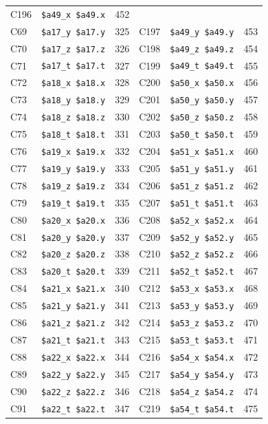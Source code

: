 \begin{table}
\begin{center}
{\begin{tabular}{|l|l|l||l|l|l|}
C196 & \verb|$a49_x $a49.x| & 452 \\
C69 & \verb|$a17_y $a17.y| & 325 &
C197 & \verb|$a49_y $a49.y| & 453 \\
C70 & \verb|$a17_z $a17.z| & 326 &
C198 & \verb|$a49_z $a49.z| & 454 \\
C71 & \verb|$a17_t $a17.t| & 327 &
C199 & \verb|$a49_t $a49.t| & 455 \\
C72 & \verb|$a18_x $a18.x| & 328 &
C200 & \verb|$a50_x $a50.x| & 456 \\
C73 & \verb|$a18_y $a18.y| & 329 &
C201 & \verb|$a50_y $a50.y| & 457 \\
C74 & \verb|$a18_z $a18.z| & 330 &
C202 & \verb|$a50_z $a50.z| & 458 \\
C75 & \verb|$a18_t $a18.t| & 331 &
C203 & \verb|$a50_t $a50.t| & 459 \\
C76 & \verb|$a19_x $a19.x| & 332 &
C204 & \verb|$a51_x $a51.x| & 460 \\
C77 & \verb|$a19_y $a19.y| & 333 &
C205 & \verb|$a51_y $a51.y| & 461 \\
C78 & \verb|$a19_z $a19.z| & 334 &
C206 & \verb|$a51_z $a51.z| & 462 \\
C79 & \verb|$a19_t $a19.t| & 335 &
C207 & \verb|$a51_t $a51.t| & 463 \\
C80 & \verb|$a20_x $a20.x| & 336 &
C208 & \verb|$a52_x $a52.x| & 464 \\
C81 & \verb|$a20_y $a20.y| & 337 &
C209 & \verb|$a52_y $a52.y| & 465 \\
C82 & \verb|$a20_z $a20.z| & 338 &
C210 & \verb|$a52_z $a52.z| & 466 \\
C83 & \verb|$a20_t $a20.t| & 339 &
C211 & \verb|$a52_t $a52.t| & 467 \\
C84 & \verb|$a21_x $a21.x| & 340 &
C212 & \verb|$a53_x $a53.x| & 468 \\
C85 & \verb|$a21_y $a21.y| & 341 &
C213 & \verb|$a53_y $a53.y| & 469 \\
C86 & \verb|$a21_z $a21.z| & 342 &
C214 & \verb|$a53_z $a53.z| & 470 \\
C87 & \verb|$a21_t $a21.t| & 343 &
C215 & \verb|$a53_t $a53.t| & 471 \\
C88 & \verb|$a22_x $a22.x| & 344 &
C216 & \verb|$a54_x $a54.x| & 472 \\
C89 & \verb|$a22_y $a22.y| & 345 &
C217 & \verb|$a54_y $a54.y| & 473 \\
C90 & \verb|$a22_z $a22.z| & 346 &
C218 & \verb|$a54_z $a54.z| & 474 \\
C91 & \verb|$a22_t $a22.t| & 347 &
C219 & \verb|$a54_t $a54.t| & 475 \\

\end{tabular}}
\end{center}
\end{table}
